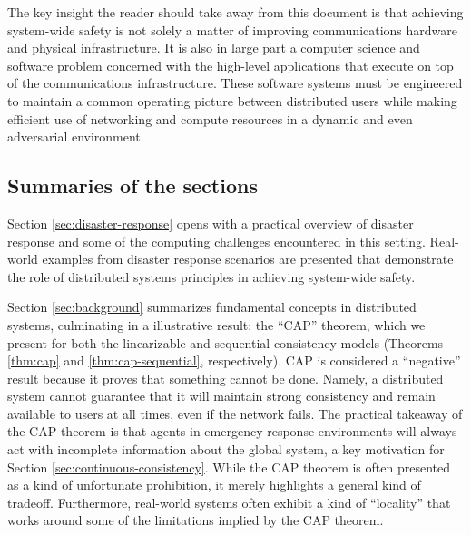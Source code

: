 \documentclass[]             %
{NASA}                       %
\theoremstyle{definition}
\begin{document}
The key insight the reader should take away from this document is that
achieving system-wide safety is not solely a matter of improving
communications hardware and physical infrastructure. It is also in
large part a computer science and software problem concerned with the
high-level applications that execute on top of the communications
infrastructure. These software systems must be engineered to maintain
a common operating picture between distributed users while making
efficient use of networking and compute resources in a dynamic and
even adversarial environment.

\subsection{Summaries of the sections}
\label{ssec:summaries-of-the-sections}

Section \ref{sec:disaster-response} opens with a practical overview of
disaster response and some of the computing challenges encountered in
this setting. Real-world examples from disaster response scenarios are
presented that demonstrate the role of distributed systems principles
in achieving system-wide safety.

Section \ref{sec:background} summarizes fundamental concepts in
distributed systems, culminating in a illustrative result: the ``CAP''
theorem, which we present for both the linearizable and sequential
consistency models (Theorems \ref{thm:cap} and
\ref{thm:cap-sequential}, respectively). CAP is considered a
``negative'' result because it proves that something cannot be
done. Namely, a distributed system cannot guarantee that it will
maintain strong consistency and remain available to users at all
times, even if the network fails. The practical takeaway of the CAP
theorem is that agents in emergency response environments will always
act with incomplete information about the global system, a key
motivation for Section \ref{sec:continuous-consistency}. While the CAP
theorem is often presented as a kind of unfortunate prohibition, it
merely highlights a general kind of tradeoff. Furthermore, real-world
systems often exhibit a kind of ``locality'' that works around some of
the limitations implied by the CAP theorem.

\end{document}
